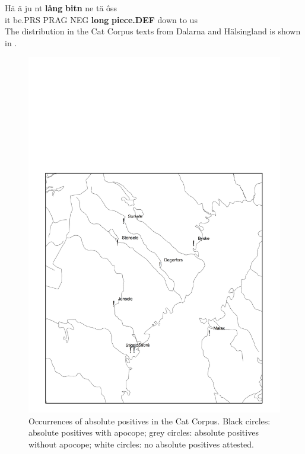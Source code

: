 \ea\label{}
\gll Hä  ä  ju  nt  \textbf{lång} \textbf{bitn} ne  tä  ôss\\
it  be.PRS  PRAG  NEG  \textbf{long} \textbf{piece.DEF} down  to  us\\The distribution in the Cat Corpus texts from Dalarna and Hälsingland is shown in .
\z 
\begin{figure}[h]

\includegraphics{figures_mod/image17}
\caption{Occurrences of absolute positives in the Cat Corpus. Black circles: absolute positives with apocope; grey circles: absolute positives without apocope; white circles: no absolute positives attested.}
\label{map:17}

\end{figure}